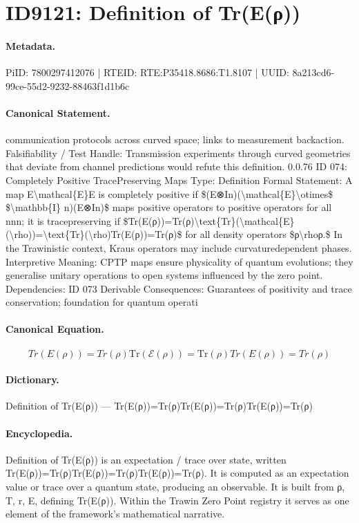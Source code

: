 \section*{ID9121: Definition of Tr(E(ρ))}
\paragraph{Metadata.}
PiID: 7800297412076 | RTEID: RTE:P35418.8686:T1.8107 | UUID: 8a213cd6-99ce-55d2-9232-88463f1d1b6c

\paragraph{Canonical Statement.}
communication protocols across curved space; links to measurement backaction. Falsifiability / Test Handle: Transmission experiments through curved geometries that deviate from channel predictions would refute this definition. 0.0.76 ID 074: Completely Positive TracePreserving Maps Type: Definition Formal Statement: A map E\textbackslash{}mathcal\{E\}E is completely positive if \$(E⊗In)(\textbackslash{}mathcal\{E\}\textbackslash{}otimes\$ \$\textbackslash{}mathbb\{I\} n)(E⊗In)\$ maps positive operators to positive operators for all nnn; it is tracepreserving if \$Tr(E(ρ))=Tr(ρ)\textbackslash{}text\{Tr\}(\textbackslash{}mathcal\{E\}(\textbackslash{}rho))=\textbackslash{}text\{Tr\}(\textbackslash{}rho)Tr(E(ρ))=Tr(ρ)\$ for all density operators \$ρ\textbackslash{}rhoρ.\$ In the Trawinistic context, Kraus operators may include curvaturedependent phases. Interpretive Meaning: CPTP maps ensure physicality of quantum evolutions; they generalise unitary operations to open systems influenced by the zero point. Dependencies: ID 073 Derivable Consequences: Guarantees of positivity and trace conservation; foundation for quantum operati

\paragraph{Canonical Equation.}
\[
Tr(E(ρ))=Tr(ρ)\text{Tr}(\mathcal{E}(\rho))=\text{Tr}(\rho)Tr(E(ρ))=Tr(ρ)
\]

\paragraph{Dictionary.}
Definition of Tr(E(ρ)) — Tr(E(ρ))=Tr(ρ)Tr(E(ρ))=Tr(ρ)Tr(E(ρ))=Tr(ρ)

\paragraph{Encyclopedia.}
Definition of Tr(E(ρ)) is an expectation / trace over state, written Tr(E(ρ))=Tr(ρ)Tr(E(ρ))=Tr(ρ)Tr(E(ρ))=Tr(ρ). It is computed as an expectation value or trace over a quantum state, producing an observable. It is built from ρ, T, r, E, defining Tr(E(ρ)). Within the Trawin Zero Point registry it serves as one element of the framework's mathematical narrative.
